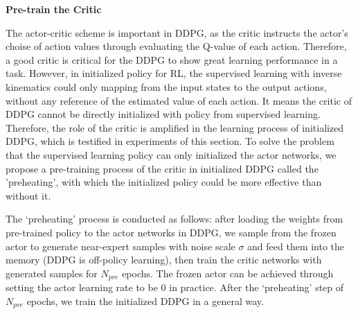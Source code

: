 \documentclass{article}
\begin{document}
\textbf{Pre-train the Critic}\label{pretrain}

The actor-critic scheme is important in DDPG, as the critic instructs the actor's choise of action values through evaluating the Q-value of each action. Therefore, a good critic is critical for the DDPG to show great learning performance in a task. However, in initialized policy for RL, the supervised learning with inverse kinematics could only mapping from the input states to the output actions, without any reference of the estimated value of each action. It means the critic of DDPG cannot be directly initialized with policy from supervised learning. Therefore, the role of the critic is amplified in the learning process of initialized DDPG, which is testified in experiments of this section. To solve the problem that the supervised learning policy can only initialized the actor networks, we propose a pre-training process of the critic in initialized DDPG called the 'preheating', with which the initialized policy could be more effective than without it.

The `preheating' process is conducted as follows: after loading the weights from pre-trained policy to the actor networks in DDPG, we sample from the frozen actor to generate near-expert samples with noise scale $\sigma$ and feed them into the memory (DDPG is off-policy learning), then train the critic networks with generated samples for $N_{pre}$ epochs. The frozen actor can be achieved through setting the actor learning rate to be 0 in practice. After the `preheating' step of $N_{pre}$ epochs, we train the initialized DDPG in a general way. 
\end{document}
